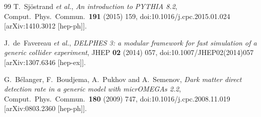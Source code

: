 \begin{thebibliography}{99}
 T.~Sj\"ostrand \emph{et al.}, \emph{An introduction to PYTHIA 8.2}, Comput.\ Phys.\ Commun.\ \textbf{191} (2015) 159, doi:10.1016/j.cpc.2015.01.024 [arXiv:1410.3012 [hep-ph]].

 J.~de~Favereau \emph{et al.}, \emph{DELPHES 3: a modular framework for fast simulation of a generic collider experiment}, JHEP \textbf{02} (2014) 057, doi:10.1007/JHEP02(2014)057 [arXiv:1307.6346 [hep-ex]].

 G.~B\'elanger, F.~Boudjema, A.~Pukhov and A.~Semenov, \emph{Dark matter direct detection rate in a generic model with micrOMEGAs 2.2}, Comput.\ Phys.\ Commun.\ \textbf{180} (2009) 747, doi:10.1016/j.cpc.2008.11.019 [arXiv:0803.2360 [hep-ph]].

\end{thebibliography}
